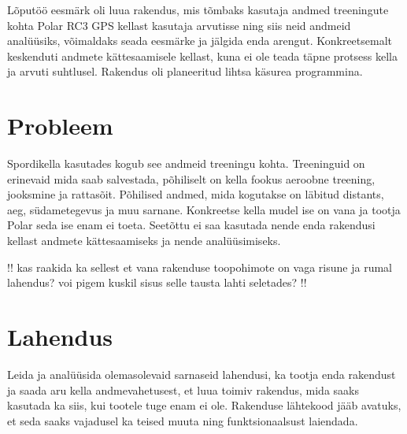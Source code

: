 Lõputöö eesmärk oli luua rakendus, mis tõmbaks kasutaja andmed treeningute kohta Polar RC3 GPS kellast kasutaja arvutisse ning siis neid andmeid analüüsiks, võimaldaks seada eesmärke ja jälgida enda arengut.
Konkreetsemalt keskenduti andmete kättesaamisele kellast, kuna ei ole teada täpne protsess kella ja arvuti suhtlusel.
Rakendus oli planeeritud lihtsa käsurea programmina.

\section{Probleem}\label{sec:probleem}
Spordikella kasutades kogub see andmeid treeningu kohta.
Treeninguid on erinevaid mida saab salvestada, põhiliselt on kella fookus aeroobne treening, jooksmine ja rattasõit.
Põhilised andmed, mida kogutakse on läbitud distants, aeg, südametegevus ja muu sarnane.
Konkreetse kella mudel ise on vana ja tootja Polar seda ise enam ei toeta.
Seetõttu ei saa kasutada nende enda rakendusi kellast andmete kättesaamiseks ja nende analüüsimiseks.

!! kas raakida ka sellest et vana rakenduse toopohimote on vaga risune ja rumal lahendus? voi pigem kuskil sisus selle tausta lahti seletades? !!

\section{Lahendus}\label{sec:lahendus}
Leida ja analüüsida olemasolevaid sarnaseid lahendusi, ka tootja enda rakendust ja saada aru kella andmevahetusest, et luua toimiv rakendus, mida saaks kasutada ka siis, kui tootele tuge enam ei ole.
Rakenduse lähtekood jääb avatuks, et seda saaks vajadusel ka teised muuta ning funktsionaalsust laiendada.

